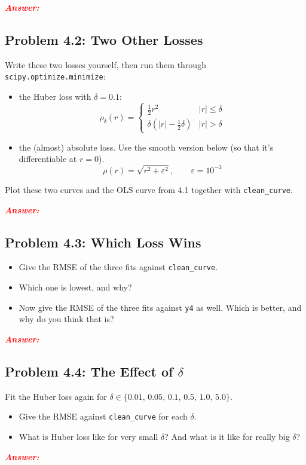 \documentclass[11pt, letterpaper]{article}
\newcommand{\subproblem}[1]{\subsection*{Problem #1}}
\newcommand{\answer}{\textbf{\textit{\textcolor{red}{Answer:}}}}
\begin{document}
\answer

\subproblem{4.2: Two Other Losses}
Write these two losses yourself, then run them through \texttt{scipy.optimize.minimize}:
\begin{itemize}
    \item the Huber loss with $\delta = 0.1$:
    $$
    \rho_\delta(r) = \begin{cases}
        \tfrac{1}{2} r^2 & |r| \le \delta \\[2pt]
        \delta \left( |r| - \tfrac{1}{2}\delta \right) & |r| > \delta
    \end{cases}
    $$
    \item the (almost) absolute loss. Use the smooth version below (so that it's differentiable at $r=0$).
    $$
    \rho(r) = \sqrt{r^2 + \varepsilon^2}, \qquad \varepsilon = 10^{-3}
    $$
\end{itemize}
Plot these two curves and the OLS curve from 4.1 together with \texttt{clean\_curve}.

\answer

\subproblem{4.3: Which Loss Wins}
\begin{itemize}
    \item Give the RMSE of the three fits against \texttt{clean\_curve}.
    \item Which one is lowest, and why?
    \item Now give the RMSE of the three fits against \texttt{y4} as well. Which is better, and why do you think that is?
\end{itemize}

\answer

\subproblem{4.4: The Effect of $\delta$}
Fit the Huber loss again for $\delta \in \{0.01,\, 0.05,\, 0.1,\, 0.5,\, 1.0,\, 5.0\}$.
\begin{itemize}
    \item Give the RMSE against \texttt{clean\_curve} for each $\delta$.
    \item What is Huber loss like for very small $\delta$? And what is it like for really big $\delta$?
\end{itemize}

\answer
\end{document}
